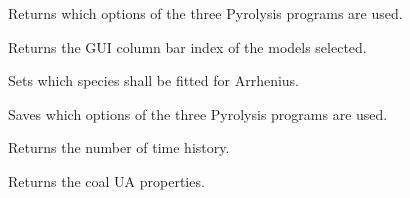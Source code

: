 \documentclass[letterpaper,10pt,english]{sphinxmanual}
\begin{document}
\begin{fulllineitems}
\begin{fulllineitems}
\end{fulllineitems}


\begin{fulllineitems}
\label{GUI:PKPgui.InfosFromGUI.RunPyrolProg}
Returns which options of the three Pyrolysis programs are used.

\end{fulllineitems}


\begin{fulllineitems}
\label{GUI:PKPgui.InfosFromGUI.RunPyrolProgReverse}
Returns the GUI column bar index of the models selected.

\end{fulllineitems}


\begin{fulllineitems}
\label{GUI:PKPgui.InfosFromGUI.SetArrhSpec}
Sets which species shall be fitted for Arrhenius.

\end{fulllineitems}


\begin{fulllineitems}
\label{GUI:PKPgui.InfosFromGUI.SetRunPyrolProg}
Saves which options of the three Pyrolysis programs are used.

\end{fulllineitems}


\begin{fulllineitems}
\label{GUI:PKPgui.InfosFromGUI.TimeHistories}
Returns the number of time history.

\end{fulllineitems}


\begin{fulllineitems}
\label{GUI:PKPgui.InfosFromGUI.UA}
Returns the coal UA properties.


\end{fulllineitems}
\end{fulllineitems}
\end{document}
